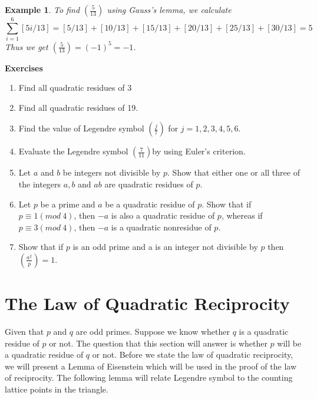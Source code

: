 \documentclass[12pt,letterpaper]{book}
\newtheorem{example}{Example}
\begin{document}
\begin{example}
To find $\left(\frac{5}{13}\right)$ using Gauss's lemma, we
calculate
\begin{equation*}
\sum_{i=1}^6[5i/13]=[5/13]+[10/13]+[15/13]+[20/13]+[25/13]+[30/13]=5
\end{equation*}
Thus we get $\left(\frac{5}{13}\right)=(-1)^5=-1$.
\end{example}

\textbf{Exercises}
\begin{enumerate}
\item{Find all quadratic residues of 3}\item{Find all quadratic
residues of 19.}\item{Find the value of Legendre symbol
$\left(\frac{j}{7}\right)$ for $j=1,2,3,4,5,6$.}\item{Evaluate the
Legendre symbol $\left(\frac{7}{11}\right)$by using Euler's
criterion.}\item{Let $a$ and $b$ be integers not divisible by $p$.
 Show that either one or all three of the integers $a,b$ and $ab$ are quadratic residues of $p$.}
\item{Let $p$ be a prime and $a$ be a quadratic residue of $p$.
Show that if $p\equiv 1(mod \ 4)$, then $-a$ is also a quadratic
residue of $p$, whereas if $p\equiv 3(mod \ 4)$, then $-a$ is a
quadratic nonresidue of $p$.}
 \item{Show that if $p$ is an odd prime and a is an integer not
divisible by $p$ then $\left(\frac{a^2}{p}\right)=1$.}
\end{enumerate}

\newpage

\section{The Law of Quadratic Reciprocity}
Given that $p$ and $q$ are odd primes.  Suppose we know whether $q$
is a quadratic residue of $p$ or not.  The question that this
section will answer is whether $p$ will be a quadratic residue of
$q$ or not. Before we state the law of quadratic reciprocity, we
will present a Lemma of Eisenstein which will be used in the proof
of the law of reciprocity.  The following lemma will relate Legendre
symbol to the counting lattice points in the triangle.
\end{document}
